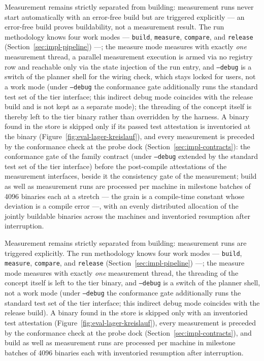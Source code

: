 \begin{nurlang}
Measurement remains strictly separated from building: measurement runs never start automatically with
an error-free build but are triggered explicitly --- an error-free build proves buildability, not a
measurement result. The run methodology knows four work modes --- \texttt{build}, \texttt{measure},
\texttt{compare}, and \texttt{release} (Section~\ref{sec:impl-pipeline}) ---; the measure mode
measures with exactly \emph{one} measurement thread, a parallel measurement execution is armed via no
registry row and reachable only via the state injection of the run entry, and \texttt{--debug} is a
switch of the planner shell for the wiring check, which stays locked for users, not a work mode (under
\texttt{--debug} the conformance gate additionally runs the standard test set of the tier interface; this indirect debug mode
coincides with the release build and is not kept as a separate mode); the
threading of the concept itself is thereby left to the tier binary rather than overridden by the
harness. A binary found in the store is skipped only if its passed test attestation is inventoried at
the binary (Figure~\ref{fig:eval-lager-kreislauf}), and every measurement is preceded by the
conformance check at the probe dock (Section~\ref{sec:impl-contracts}): the conformance gate of the
family contract (under \texttt{--debug} extended by the standard test set of the tier interface) before the post-compile
attestations of the measurement interfaces, beside it the
consistency gate of the measurement; build as well as measurement runs are processed per machine in
milestone batches of 4096 binaries each at a stretch --- the grain is a compile-time constant whose
deviation is a compile error ---, with an evenly distributed allocation of the jointly buildable
binaries across the machines and inventoried resumption after interruption.
\end{nurlang}
\begin{nurkurz}
Measurement remains strictly separated from building: measurement runs are triggered explicitly. The run
methodology knows four work modes --- \texttt{build}, \texttt{measure}, \texttt{compare}, and
\texttt{release} (Section~\ref{sec:impl-pipeline}) ---; the measure mode measures with exactly \emph{one}
measurement thread, the threading of the concept itself is left to the tier binary, and \texttt{--debug} is
a switch of the planner shell, not a work mode (under \texttt{--debug} the conformance gate additionally
runs the standard test set of the tier interface; this indirect debug mode coincides with the release build). A binary found in
the store is skipped only with an
inventoried test attestation (Figure~\ref{fig:eval-lager-kreislauf}), every measurement is preceded by the
conformance check at the probe dock (Section~\ref{sec:impl-contracts}), and build as well as measurement runs
are processed per machine in milestone batches of 4096 binaries each with inventoried resumption after
interruption.
\end{nurkurz}

